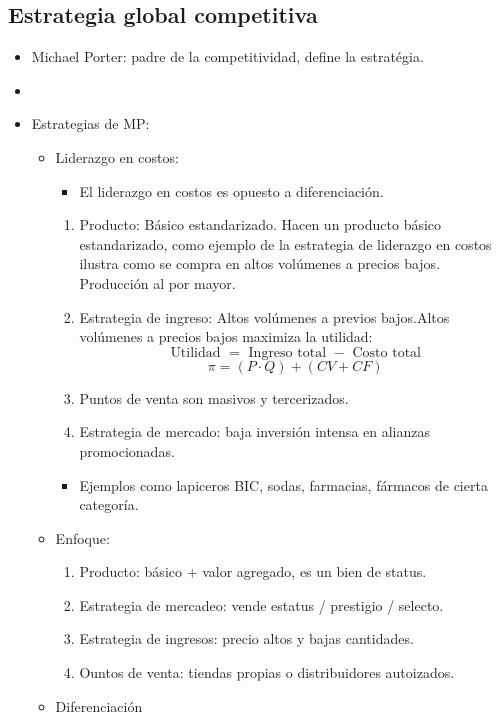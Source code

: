 \subsection{Estrategia global competitiva}
\begin{itemize}
    \item Michael Porter: padre de la competitividad, define la estratégia.
    \item {} 
    \item Estrategias de MP:
        \begin{itemize}
            \item Liderazgo en costos: 
                \begin{itemize}
                    \item El liderazgo en costos es opuesto a diferenciación. 
                \end{itemize}
                \begin{enumerate}
                    \item Producto: Básico estandarizado. Hacen un producto básico estandarizado, como ejemplo de la estrategia de liderazgo en costos ilustra como se compra en altos volúmenes a precios bajos. Producción al por mayor.
                    \item Estrategia de ingreso: Altos volúmenes a previos bajos.Altos volúmenes a precios bajos maximiza la utilidad:
                        \[
                        \text{ Utilidad }= \text{ Ingreso total } - \text{ Costo total }
                        \]
                        \[
                        \pi = (P\cdot Q) + (CV+CF)
                        \]
                    
                    \item Puntos de venta son masivos y tercerizados.
                    \item Estrategia de mercado: baja inversión intensa en alianzas promocionadas.
                \end{enumerate}
                \begin{itemize}[label=\#]
                    \item Ejemplos como lapiceros BIC, sodas, farmacias, fármacos de cierta categoría.
                \end{itemize}

            \item Enfoque: 
                \begin{enumerate}
                    \item Producto: básico + valor agregado, es un bien de status.
                    \item Estrategia de mercadeo: vende estatus / prestigio / selecto.
                    \item Estrategia de ingresos: precio altos y bajas cantidades.
                    \item Ountos de venta: tiendas propias o distribuidores autoizados.
                \end{enumerate}
            \item Diferenciación
        \end{itemize}
\end{itemize}
